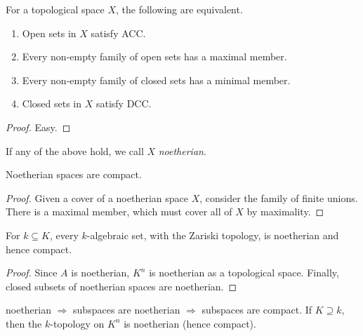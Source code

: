  \begin{proposition}
   For a topological space $X$, the following are equivalent.
   \begin{enumerate}
     \item Open sets in $X$ satisfy ACC.
     \item Every non-empty family of open sets has a maximal member.
     \item Every non-empty family of closed sets has a minimal member.
     \item Closed sets in $X$ satisfy DCC.
   \end{enumerate}
 \end{proposition}
 \begin{proof}
   Easy.
 \end{proof}
 \begin{definition}
   If any of the above hold, we call $X$ \emph{noetherian}.
 \end{definition}
 \begin{proposition}
   Noetherian spaces are compact.
 \end{proposition}
 \begin{proof}
   Given a cover of a noetherian space $X$, consider the family of finite unions. There
   is a maximal member, which must cover all of $X$ by maximality.
 \end{proof}
 \begin{corollary}
   For $k\subseteq K$, every $k$-algebraic set, with the Zariski topology, is noetherian
   and hence compact.
 \end{corollary}
 \begin{proof}
   Since $A$ is noetherian, $K^n$ is noetherian as a topological space. Finally, closed
   subsets of noetherian  spaces are noetherian.
 \end{proof}
 \setcounter{lecture}{18}

 noetherian $\Rightarrow$ subspaces are noetherian $\Rightarrow$ subspaces are compact.
 If $K\supseteq k$, then the $k$-topology on $K^n$ is noetherian (hence compact).

